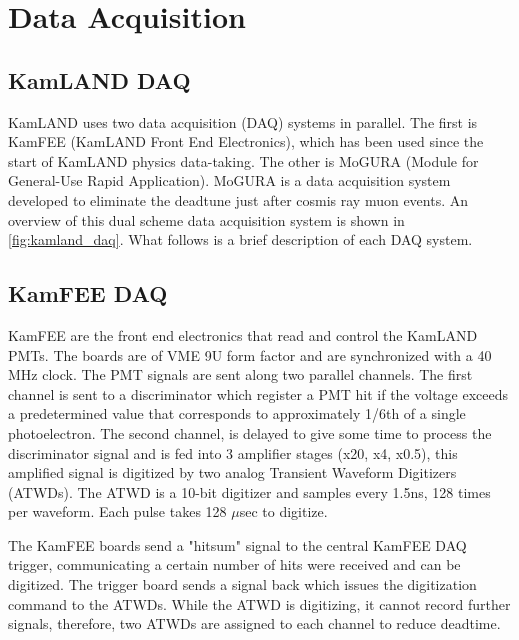 \section{Data Acquisition}
\subsection{KamLAND DAQ}
KamLAND uses two data acquisition (DAQ) systems in parallel. The first is KamFEE (KamLAND Front End Electronics), which has been used since the start of KamLAND physics data-taking. The other is MoGURA (Module for General-Use Rapid Application). MoGURA is a data acquisition system developed to eliminate the deadtune just after cosmis ray muon events. An overview of this dual scheme data acquisition system is shown in \ref{fig:kamland_daq}. What follows is a brief description of each DAQ system.
\subsection{KamFEE DAQ}
KamFEE are the front end electronics that read and control the KamLAND PMTs. The boards are of VME 9U form factor and are synchronized with a 40 MHz clock. The PMT signals are sent along two parallel channels. The first channel is sent to a discriminator which register a PMT hit if the voltage exceeds a predetermined value that corresponds to approximately 1/6th of a single photoelectron. The second channel, is delayed to give some time to process the discriminator signal and is fed into 3 amplifier stages (x20, x4, x0.5), this amplified signal is digitized by two analog Transient Waveform Digitizers (ATWDs). The ATWD is a 10-bit digitizer and samples every 1.5ns, 128 times per waveform. Each pulse takes 128 $\mu$sec to digitize.

The KamFEE boards send a "hitsum" signal to the central KamFEE DAQ trigger, communicating a certain number of hits were received and can be digitized. The trigger board sends a signal back which issues the digitization command to the ATWDs. While the ATWD is digitizing, it cannot record further signals, therefore, two ATWDs are assigned to each channel to reduce deadtime.

